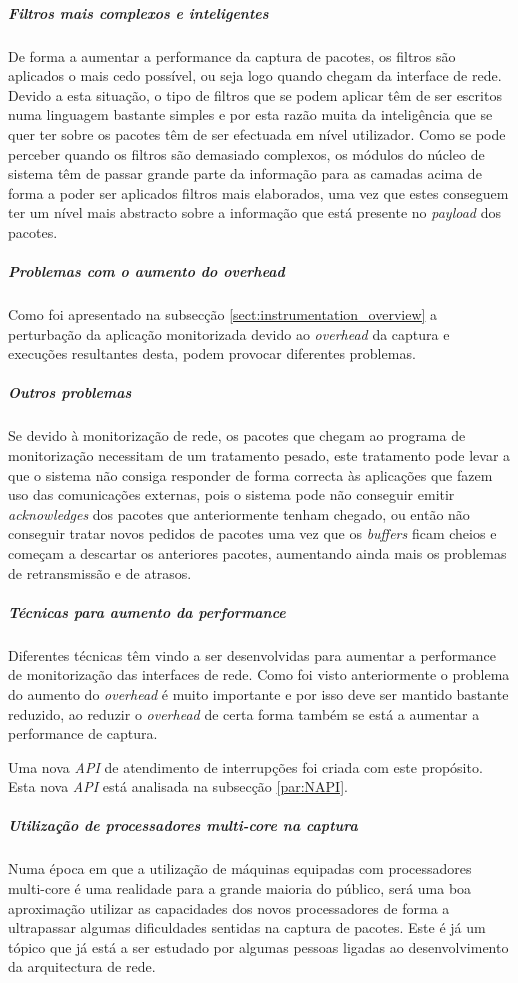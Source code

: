 \subparagraph*{Filtros mais complexos e inteligentes} De forma a aumentar a performance da captura de pacotes, os filtros são aplicados o mais cedo possível, ou seja logo quando chegam da interface de rede. Devido a esta situação, o tipo de filtros que se podem aplicar têm de ser escritos numa linguagem bastante simples e por esta razão muita da inteligência que se quer ter sobre os pacotes têm de ser efectuada em nível utilizador. Como se pode perceber quando os filtros são demasiado complexos, os módulos do núcleo de sistema têm de passar grande parte da informação para as camadas acima de forma a poder ser aplicados filtros mais elaborados, uma vez que estes conseguem ter um nível mais abstracto sobre a informação que está presente no \textit{payload} dos pacotes.

\subparagraph*{Problemas com o aumento do overhead}
Como foi apresentado na subsecção \ref{sect:instrumentation_overview} a perturbação da aplicação monitorizada devido ao \textit{overhead} da captura e execuções resultantes desta, podem provocar diferentes problemas.

\subparagraph*{Outros problemas
}
Se devido à monitorização de rede, os pacotes que chegam ao programa de monitorização necessitam de um tratamento pesado, este tratamento pode levar a que o sistema não consiga responder de forma correcta às aplicações que fazem uso das comunicações externas, pois o sistema pode não conseguir emitir \textit{acknowledges} dos pacotes que anteriormente tenham chegado, ou então não conseguir tratar novos pedidos de pacotes uma vez que os \textit{buffers} ficam cheios e começam a descartar os anteriores pacotes, aumentando ainda mais os problemas de retransmissão e de atrasos.

\subparagraph*{Técnicas para aumento da performance}
Diferentes técnicas têm vindo a ser desenvolvidas para aumentar a performance de monitorização das interfaces de rede. Como foi visto anteriormente o problema do aumento do \textit{overhead} é muito importante e por isso deve ser mantido bastante reduzido, ao reduzir o \textit{overhead} de certa forma também se está a aumentar a performance de captura.

Uma nova \textit{API} de atendimento de interrupções foi criada com este propósito. Esta nova \textit{API} está analisada na subsecção \ref{par:NAPI}.

\subparagraph*{Utilização de processadores \textit{multi-core} na captura}
Numa época em que a utilização de máquinas equipadas com processadores multi-core é uma realidade para a grande maioria do público, será uma boa aproximação utilizar as capacidades dos novos processadores de forma a ultrapassar algumas dificuldades sentidas na captura de pacotes. Este é já um tópico que já está a ser estudado por algumas pessoas ligadas ao desenvolvimento da arquitectura de rede.


